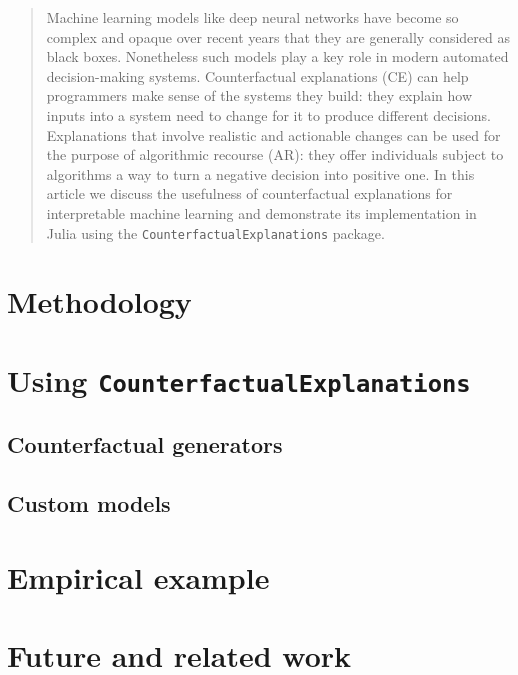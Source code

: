 \documentclass{juliacon}
\begin{document}


\maketitle

\begin{abstract}

Machine learning models like deep neural networks have become so complex and opaque over recent years that they are generally considered as black boxes. Nonetheless such models play a key role in modern automated decision-making systems. Counterfactual explanations (CE) can help programmers make sense of the systems they build: they explain how inputs into a system need to change for it to produce different decisions. Explanations that involve realistic and actionable changes can be used for the purpose of algorithmic recourse (AR): they offer individuals subject to algorithms a way to turn a negative decision into positive one. In this article we discuss the usefulness of counterfactual explanations for interpretable machine learning and demonstrate its implementation in Julia using the \verb|CounterfactualExplanations| package.

\end{abstract}

\section{Methodology}
\label{sec:methodology}

\section{Using \texttt{CounterfactualExplanations}}
\label{sec:using}

\subsection{Counterfactual generators}
\label{sec:generators}

\subsection{Custom models}
\label{sec:models}

\section{Empirical example}
\label{sec:empirics}

\section{Future and related work}
\label{sec:related}

\cite{wachter2017counterfactual}


\end{document}
